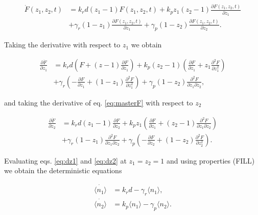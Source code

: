 \begin{equation}
\label{eq:masterF}
\begin{split}
\dot{F}(z_1,z_2,t) &= k_rd(z_1-1)F(z_1,z_2,t) + k_pz_1(z_2-1)\frac{\partial F(z_1,z_2,t)}{\partial z_1} \\
&+ \gamma_r(1-z_1)\frac{\partial F(z_1,z_2,t)}{\partial z_1} + \gamma_p(1-z_2)\frac{\partial F(z_1,z_2,t)}{\partial z_2}.
\end{split}
\end{equation}

Taking the derivative with respect to $z_1$ we obtain

\begin{equation}
\label{eq:dz1}
\begin{split}
\frac{\partial \dot{F}}{\partial z_1} &= k_rd\left( F+(z-1)\frac{\partial F}{\partial z_1} \right) + k_p(z_2-1) \left( \frac{\partial F}{\partial z_1} + z_1 \frac{\partial^2 F}{\partial z_1^2} \right)\\
&+\gamma_r\left(-\frac{\partial F}{\partial z_1}+(1-z_1)\frac{\partial^2 F}{\partial z_1^2}\right)+\gamma_p(1-z_2)\frac{\partial^2 F}{\partial z_1 \partial z_2},
\end{split}
\end{equation}

and taking the derivative of eq. \ref{eq:masterF} with respect to $z_2$

\begin{equation}
\label{eq:dz2}
\begin{split}
\frac{\partial \dot{F}}{\partial z_2}&=k_rd(z_1-1)\frac{\partial F}{\partial z_2} + k_pz_1\left(\frac{\partial F}{\partial z_1} + (z_2-1)\frac{\partial^2 F}{\partial z_1 \partial z_2} \right)\\
&+ \gamma_r(1-z_1)\frac{\partial^2 F}{\partial z_1 \partial z_2} + \gamma_p\left(-\frac{\partial F}{\partial z_2}+(1-z_2)\frac{\partial^2 F}{\partial z_2^2}\right).
\end{split}
\end{equation}

Evaluating eqs. \ref{eq:dz1} and \ref{eq:dz2} at $z_1 = z_2 = 1$ and using properties (FILL) we obtain the deterministic equations

\begin{align*}
\dot{\langle n_1 \rangle}&= k_rd - \gamma_r \langle n_1 \rangle,\\
\dot{\langle n_2 \rangle}&= k_p\langle n_1 \rangle - \gamma_p \langle n_2 \rangle.
\end{align*}


